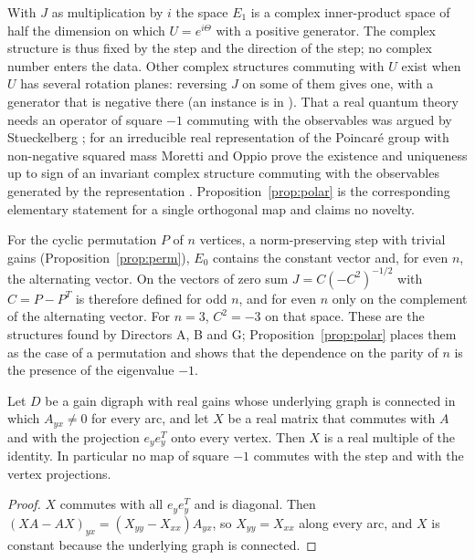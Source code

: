 With $J$ as multiplication by $i$ the space $E_1$ is a complex inner-product space of half the dimension on which $U=e^{i\Theta}$ with a positive generator. The complex structure is thus fixed by the step and the direction of the step; no complex number enters the data. Other complex structures commuting with $U$ exist when $U$ has several rotation planes: reversing $J$ on some of them gives one, with a generator that is negative there (an instance is in \cite{comp3}). That a real quantum theory needs an operator of square $-1$ commuting with the observables was argued by Stueckelberg \cite{stueckelberg}; for an irreducible real representation of the Poincar\'e group with non-negative squared mass Moretti and Oppio prove the existence and uniqueness up to sign of an invariant complex structure commuting with the observables generated by the representation \cite{mo}. Proposition~\ref{prop:polar} is the corresponding elementary statement for a single orthogonal map and claims no novelty.

\begin{remark}\label{rem:cycles}
For the cyclic permutation $P$ of $n$ vertices, a norm-preserving step with trivial gains (Proposition~\ref{prop:perm}), $E_0$ contains the constant vector and, for even $n$, the alternating vector. On the vectors of zero sum $J=C(-C^2)^{-1/2}$ with $C=P-P^T$ is therefore defined for odd $n$, and for even $n$ only on the complement of the alternating vector. For $n=3$, $C^2=-3$ on that space. These are the structures found by Directors A, B and G; Proposition~\ref{prop:polar} places them as the case of a permutation and shows that the dependence on the parity of $n$ is the presence of the eigenvalue $-1$.
\end{remark}

\begin{proposition}[Records]\label{prop:records}
Let $D$ be a gain digraph with real gains whose underlying graph is connected in which $A_{yx}\ne0$ for every arc, and let $X$ be a real matrix that commutes with $A$ and with the projection $e_ye_y^T$ onto every vertex. Then $X$ is a real multiple of the identity. In particular no map of square $-1$ commutes with the step and with the vertex projections.
\end{proposition}
\begin{proof}
$X$ commutes with all $e_ye_y^T$ and is diagonal. Then $(XA-AX)_{yx}=(X_{yy}-X_{xx})A_{yx}$, so $X_{yy}=X_{xx}$ along every arc, and $X$ is constant because the underlying graph is connected.
\end{proof}

